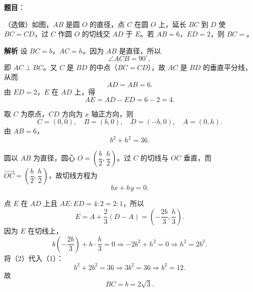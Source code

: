 \begin{answer}

\textbf{题目}：

（选做）如图，$AB$ 是圆 $O$ 的直径，点 $C$ 在圆 $O$ 上，延长 $BC$ 到 $D$ 使 $BC=CD$，过 $C$ 作圆 $O$ 的切线交 $AD$ 于 $E$。若 $AB=6$，$ED=2$，则 $BC=$\gkblank{}。
\nopagebreak[4]
\begin{center}\end{center}
\nopagebreak[4]
\textbf{解析}
设 $BC=b$，$AC=h$。因为 $AB$ 是直径，所以
\nopagebreak[4]
\[\angle ACB=90^\circ,\]
即 $AC\perp BC$。又 $C$ 是 $BD$ 的中点（$BC=CD$），故 $AC$ 是 $BD$ 的垂直平分线，从而
\nopagebreak[4]
\[AD=AB=6.\]
由 $ED=2$，$E$ 在 $AD$ 上，得
\nopagebreak[4]
\[AE=AD-ED=6-2=4.\]

取 $C$ 为原点，$CD$ 方向为 $x$ 轴正方向，则
\nopagebreak[4]
\[C=(0,0),\quad B=(b,0),\quad D=(-b,0),\quad A=(0,h).\]
由 $AB=6$，
\nopagebreak[4]
\[b^2+h^2=36. \tag{1}\]

圆以 $AB$ 为直径，圆心 $O=\left(\dfrac b2,\dfrac h2\right)$。过 $C$ 的切线与 $OC$ 垂直，而 $\overrightarrow{OC}=\left(\dfrac b2,\dfrac h2\right)$，故切线方程为
\nopagebreak[4]
\[bx+hy=0.\]

点 $E$ 在 $AD$ 上且 $AE:ED=4:2=2:1$，所以
\nopagebreak[4]
\[E=A+\frac23(D-A)=\left(-\frac{2b}{3},\frac h3\right).\]
因为 $E$ 在切线上，
\nopagebreak[4]
\[b\left(-\frac{2b}{3}\right)+h\cdot\frac h3=0
\Longrightarrow -2b^2+h^2=0
\Longrightarrow h^2=2b^2. \tag{2}\]
将（2）代入（1）：
\nopagebreak[4]
\[b^2+2b^2=36\Longrightarrow 3b^2=36\Longrightarrow b^2=12.\]
故
\nopagebreak[4]
\[BC=b=2\sqrt3.\]


\end{answer}
